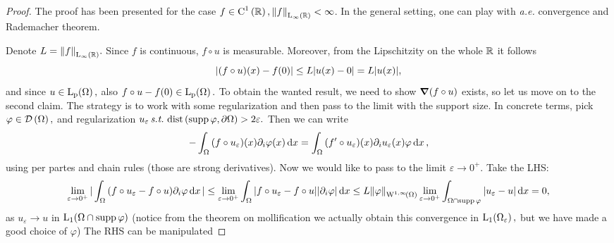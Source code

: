 \documentclass{article}
\begin{document}
\begin{proof}
	The proof has been presented for the case $f \in \text{C}^{1}\!\,\left({\mathbb R} \right), \norm{f}_{\text{L}_{\infty}\!\,\left({\mathbb R} \right)} < \infty$. In the general setting, one can play with \textit{a.e.} convergence and Rademacher theorem.

	Denote $L = \norm{f}_{\text{L}_{\infty}\!\,\left({\mathbb R} \right)}.$ Since $f$ is continuous, $f \circ u$ is measurable. Moreover, from the Lipschitzity on the whole ${\mathbb R}$ it follows
	\[
		\abs{(f \circ u)(x) - f(0)} \leq L \abs{u(x) - 0} = L \abs{u(x)},
	\]
	and since $u \in \LpSet{\Omega},$ also $f\circ u - f(0) \in \LpSet{\Omega}.$ To obtain the wanted result, we need to show $\grad\qty(f \circ u)$ exists, so let us move on to the second claim. The strategy is to work with some regularization and then pass to the limit with the support size. In concrete terms, pick $\varphi \in \mathcal{D}\!\,\left(\Omega \right),$ and regularization $u_{\varepsilon} \, \text{\textit{s.t.}} \, \operatorname{dist}\qty(\operatorname{supp} \varphi, \partial \Omega) > 2 \varepsilon.$ Then we can write
	\[
		- \int_{\Omega}\qty(f \circ u_{\varepsilon})(x) \partial_{i}\varphi(x)\dd{x} = \int_{\Omega}\qty(f' \circ u_{\varepsilon})(x)\partial_{i}u_{\varepsilon}(x)\varphi \dd{x},
	\]
using per partes and chain rules (those are strong derivatives). Now we would like to pass to the limit $\varepsilon \to 0^+.$ Take the LHS:
\[
	\lim_{\varepsilon\to 0^{+}}|\int_{\Omega}\qty(f \circ u_{\varepsilon} - f \circ u)\partial_{i}\varphi \dd{x}| \leq \lim_{\varepsilon \to 0^{+}}\int_{\Omega}\abs{f \circ u_{\varepsilon} - f \circ u}\abs{\partial_{i}\varphi}\dd{x} \leq L \norm{\varphi}_{\WkpSet[1][\infty]{\Omega}}\lim_{\varepsilon \to 0^+}\int_{\Omega \cap \supp \varphi}|u_{\varepsilon} - u|\dd{x} = 0,
\]
as $u_{\varepsilon} \to u$ in $\LpSet[1]{\Omega \cap \supp \varphi}$ (notice from the theorem on mollification we actually obtain this convergence in $\LpSet[1]{\Omega_{\varepsilon}},$ but we have made a good choice of $\varphi$) The RHS can be manipulated


\end{proof}
\end{document}
